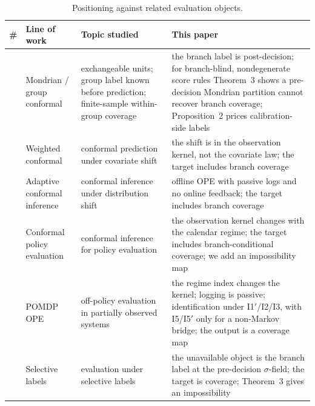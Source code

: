 \begin{table}[!ht]
\centering
\footnotesize
\setlength{\tabcolsep}{3pt}
\caption{Positioning against related evaluation objects.}
\label{tab:9}
\begin{tabular}{@{}>{\raggedright\arraybackslash}p{}
  >{\raggedright\arraybackslash}p{}
  >{\raggedright\arraybackslash}p{}
  >{\raggedright\arraybackslash}p{}@{}}
\toprule
\textbf{\#} & \textbf{Line of work} & \textbf{Topic studied} &
\textbf{This paper} \\
\midrule
1 & Mondrian / group conformal \cite{vovk2005,lei2018} &
exchangeable units; group label known before prediction; finite-sample
within-group coverage &
the branch label is post-decision; for branch-blind, nondegenerate score rules
Theorem~3 shows a pre-decision Mondrian partition cannot recover branch coverage;
Proposition~2 prices calibration-side labels \\
\addlinespace
2 & Weighted conformal \cite{tibshirani2019} &
conformal prediction under covariate shift &
the shift is in the observation kernel, not the covariate law; the target
includes branch coverage \\
\addlinespace
3 & Adaptive conformal inference \cite{gibbs2021} &
conformal inference under distribution shift &
offline OPE with passive logs and no online feedback; the target includes
branch coverage \\
\addlinespace
4 & Conformal policy evaluation \cite{gan2025} &
conformal inference for policy evaluation &
the observation kernel changes with the calendar regime; the target includes
branch-conditional coverage; we add an impossibility map \\
\addlinespace
5 & POMDP OPE \cite{zhang2024,zhang2025,luo2026} &
off-policy evaluation in partially observed systems &
the regime index changes the kernel; logging is passive; identification under
I1$'$/I2/I3, with I5/I5$'$ only for a non-Markov bridge; the output is a
coverage map \\
\addlinespace
6 & Selective labels \cite{lakkaraju2017} &
evaluation under selective labels &
the unavailable object is the branch label at the pre-decision
$\sigma$-field; the target is coverage; Theorem~3 gives an impossibility \\

\end{tabular}
\end{table}
